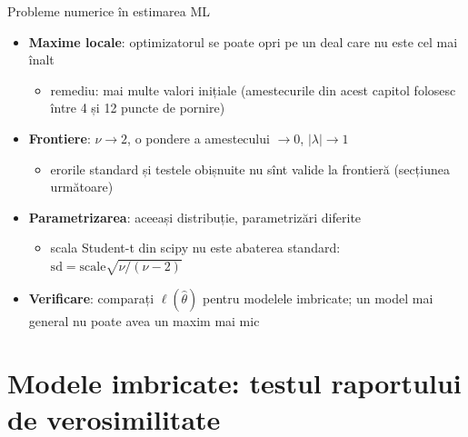 \begin{frame}{Probleme numerice în estimarea ML}
\itemsize{\small}
\begin{itemize}
    \item \textbf{Maxime locale}: optimizatorul se poate opri pe un deal care nu este cel mai înalt
    \begin{itemize}
        \item remediu: mai multe valori inițiale (amestecurile din acest capitol folosesc între 4 și 12 puncte de pornire)
    \end{itemize}
    \item \textbf{Frontiere}: $\nu \to 2$, o pondere a amestecului $\to 0$, $|\lambda| \to 1$
    \begin{itemize}
        \item erorile standard și testele obișnuite nu sînt valide la frontieră (secțiunea următoare)
    \end{itemize}
    \item \textbf{Parametrizarea}: aceeași distribuție, parametrizări diferite
    \begin{itemize}
        \item scala Student-t din scipy nu este abaterea standard: $\mathrm{sd} = \mathrm{scale}\sqrt{\nu/(\nu - 2)}$
    \end{itemize}
    \item \textbf{Verificare}: comparați $\ell(\hat\theta)$ pentru modelele imbricate; un model mai general nu poate avea un maxim mai mic
\end{itemize}
\end{frame}


\section{Modele imbricate: testul raportului de verosimilitate}

